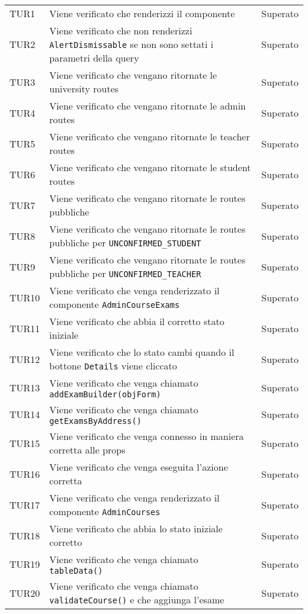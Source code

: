 \documentclass[PianoDiQualifica.tex]{subfiles}
\begin{document}
\begin{longtable}[H]{P{2cm}P{8.5cm}P{3cm}}
	\hhline{===}
	TUR1 & Viene verificato che renderizzi il componente & Superato \\ 
	TUR2 & Viene verificato che non renderizzi \texttt{AlertDismissable} se non sono settati i parametri della query & Superato \\ 
	TUR3 & Viene verificato che vengano ritornate le university routes  & Superato \\ 
	TUR4 & Viene verificato che vengano ritornate le admin routes  & Superato \\ 
	TUR5 & Viene verificato che vengano ritornate le teacher routes  & Superato \\ 
	TUR6 & Viene verificato che vengano ritornate le student routes  & Superato \\ 
	TUR7 & Viene verificato che vengano ritornate le routes pubbliche & Superato \\ 
	TUR8 & Viene verificato che vengano ritornate le routes pubbliche per \texttt{UNCONFIRMED\_STUDENT} & Superato \\ 
	TUR9 & Viene verificato che vengano ritornate le routes pubbliche per \texttt{UNCONFIRMED\_TEACHER} & Superato \\ 
	TUR10 & Viene verificato che venga renderizzato il componente \texttt{AdminCourseExams} & Superato \\ 
	TUR11 & Viene verificato che abbia il corretto stato iniziale & Superato \\ 
	TUR12 & Viene verificato che lo stato cambi quando il bottone \texttt{Details} viene cliccato & Superato \\ 
	TUR13 & Viene verificato che venga chiamato \texttt{addExamBuilder(objForm)} & Superato \\ 
	TUR14 & Viene verificato che venga chiamato \texttt{getExamsByAddress()} & Superato \\ 
	TUR15 & Viene verificato che venga connesso in maniera corretta alle props & Superato \\ 
	TUR16 & Viene verificato che venga eseguita l'azione corretta & Superato \\ 
	TUR17 & Viene verificato che venga renderizzato il componente \texttt{AdminCourses} & Superato \\ 
	TUR18 & Viene verificato che abbia lo stato iniziale corretto & Superato \\ 
	TUR19 & Viene verificato che venga chiamato \texttt{tableData()} & Superato \\ 
	TUR20 & Viene verificato che venga chiamato \texttt{validateCourse()} e che aggiunga l'esame & Superato \\ 

\end{longtable}
\end{document}
